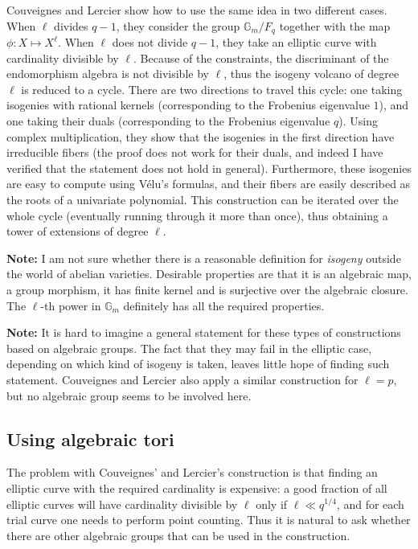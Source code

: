 \documentclass[11pt]{article}
\begin{document}
Couveignes and Lercier show how to use the same idea in two different
cases. When $\ell$ divides $q-1$, they consider the group
$\mathbb{G}_m/F_q$ together with the map $\phi:X\mapsto X^\ell$. When
$\ell$ does not divide $q-1$, they take an elliptic curve with
cardinality divisible by $\ell$. Because of the constraints, the
discriminant of the endomorphism algebra is not divisible by $\ell$,
thus the isogeny volcano of degree $\ell$ is reduced to a cycle. There
are two directions to travel this cycle: one taking isogenies with
rational kernels (corresponding to the Frobenius eigenvalue $1$), and
one taking their duals (corresponding to the Frobenius eigenvalue
$q$). Using complex multiplication, they show that the isogenies in
the first direction have irreducible fibers (the proof does not work
for their duals, and indeed I have verified that the statement does
not hold in general). Furthermore, these isogenies are easy to compute
using Vélu's formulas, and their fibers are easily described as the
roots of a univariate polynomial. This construction can be iterated
over the whole cycle (eventually running through it more than once),
thus obtaining a tower of extensions of degree $\ell$.

\textbf{Note:} I am not sure whether there is a reasonable definition
for \emph{isogeny} outside the world of abelian varieties. Desirable
properties are that it is an algebraic map, a group morphism, it has
finite kernel and is surjective over the algebraic closure. The
$\ell$-th power in $\mathbb{G}_m$ definitely has all the required
properties.

\textbf{Note:} It is hard to imagine a general statement for these
types of constructions based on algebraic groups. The fact that they
may fail in the elliptic case, depending on which kind of isogeny is
taken, leaves little hope of finding such statement. Couveignes and
Lercier also apply a similar construction for $\ell=p$, but no
algebraic group seems to be involved here.

   
\subsection{Using algebraic tori}

The problem with Couveignes' and Lercier's construction is that
finding an elliptic curve with the required cardinality is expensive:
a good fraction of all elliptic curves will have cardinality divisible
by $\ell$ only if $\ell\ll q^{1/4}$, and for each trial curve one
needs to perform point counting. Thus it is natural to ask whether
there are other algebraic groups that can be used in the construction.
\end{document}
